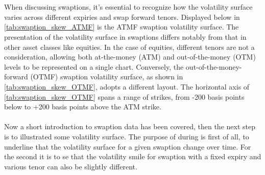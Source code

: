 \\\\
When discussing swaptions, it's essential to recognize how the volatility surface varies across different expiries and swap 
forward tenors. Displayed below in \autoref{tab:swaption_skew_ATMF} is the ATMF swaption volatility surface. 
The presentation of the volatility surface in swaptions differs notably from that in other asset classes like equities. 
In the case of equities, different tenors are not a consideration, allowing both at-the-money (ATM) and out-of-the-money (OTM) 
levels to be represented on a single chart. Conversely, the out-of-the-money-forward (OTMF) swaption volatility surface, 
as shown in \autoref{tab:swaption_skew_OTMF}, adopts a different layout. The horizontal axis of 
\autoref{tab:swaption_skew_OTMF} spans a range of strikes, from -200 basis points below to +200 basis points above the ATM strike.
\\\\
Now a short introduction to swaption data has been covered, then the next step is to illustrated some 
volatility surface. The purpose of during is first of all, to underline that the volatility surface for a 
given swaption change over time. For the second it is to se that the volatility smile for swaption with a fixed
expiry and various tenor can also be slightly different.  
